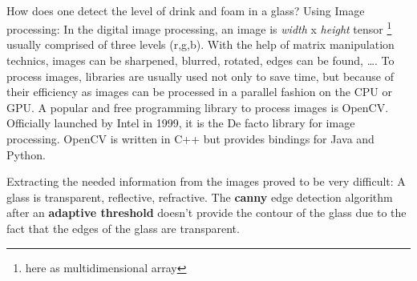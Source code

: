 \documentclass[11pt]{article}
\begin{document}
    \paragraph*{}
    How does one detect the level of drink and foam in a glass?
    Using Image processing: In the digital image processing, an image is \textit{width} x \textit{height} tensor
    \footnote{here as multidimensional array} usually comprised of three levels (r,g,b).
    With the help of matrix manipulation technics, images can be sharpened, blurred, rotated, edges can be found, \ldots .
    To process images, libraries are usually used not only to save time, but because of their efficiency as images can
    be processed in a parallel fashion on the CPU or GPU.
    A popular and free programming library to process images is OpenCV.
    Officially launched by Intel in 1999, it is the De facto library for image processing.
    OpenCV is written in C++ but provides bindings for Java and Python.

    Extracting the needed information from the images proved to be very difficult: A glass is transparent, reflective,
    refractive.
    The \textbf{canny} edge detection algorithm after an \textbf{adaptive threshold} doesn't provide the
    contour of the glass due to the fact that the edges of the glass are transparent.
\end{document}
